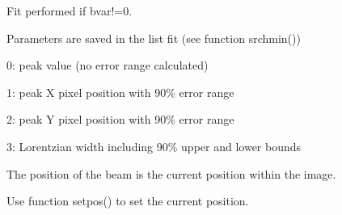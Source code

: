 \documentclass[letterpaper,10pt,english]{sphinxmanual}
\begin{document}
\begin{fulllineitems}
\begin{DUlineblock}{0em}
\item[] 
\item[] Fit performed if bvar!=0.
\item[] Parameters are saved in the list fit (see function srchmin())
\item[]
\begin{DUlineblock}{\DUlineblockindent}
\item[] 0:      peak value (no error range calculated)
\item[] 1:      peak X pixel position with 90\% error range
\item[] 2:      peak Y pixel position with 90\% error range
\item[] 3:      Lorentzian width including 90\% upper and lower bounds
\item[] 
\end{DUlineblock}
\item[] The position of the beam is the current position within the image.
\item[] Use function setpos() to set the current position.
\end{DUlineblock}

\end{fulllineitems}

\end{document}
